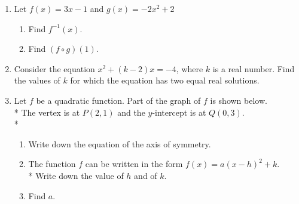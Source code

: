 \documentclass[12pt, twoside]{article}
\begin{document}
\begin{enumerate}
\newpage

\item Let $f(x)=3x-1$ and $g(x)=-2x^2+2$
\begin{enumerate}
    \item Find $f^{-1}(x)$.
    \item Find $(f \circ g)(1)$.
\end{enumerate}

\item Consider the equation $x^2 + (k-2)x=-4$, where $k$ is a real number. Find the values of $k$ for which the equation has two equal real solutions.

\item Let $f$ be a quadratic function. Part of the graph of $f$ is shown below.\\*
The vertex is at $P(2,1)$ and the $y$-intercept is at $Q(0, 3)$.\\*

  \begin{figure}[!htbp]
  \begin{center}
  \end{center}
  \end{figure}

\begin{enumerate}
    \item Write down the equation of the axis of symmetry.
    \item The function $f$ can be written in the form $f(x)=a(x-h)^2 +k$. \\*
    Write down the value of $h$ and of $k$.
    \item Find $a$.
\end{enumerate}


\end{enumerate}
\end{document}

